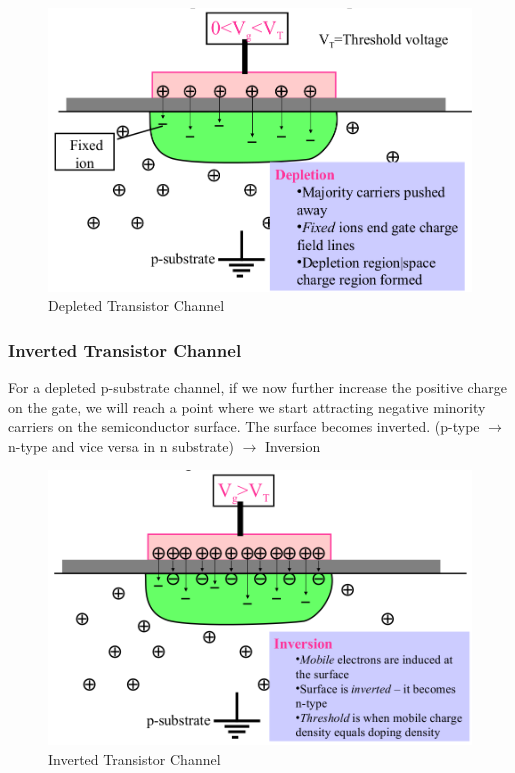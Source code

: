 \documentclass[main]{subfiles}
\begin{document}
\begin{figure}[H]
  \centering
  \includegraphics[scale=1]{figs/channel_depletion.png}
  \caption{Depleted Transistor Channel \cite{lec2}}
  \label{fig:channel_depletion}
\end{figure}

\subsubsection{Inverted Transistor Channel}
For a depleted p-substrate channel, if we now further increase the positive charge on the gate, we will reach a point where we start attracting negative minority carriers on the semiconductor surface. The surface becomes inverted. (p-type $\rightarrow$ n-type and vice versa in n substrate)  $\rightarrow$ Inversion
\begin{figure}[H]
  \centering
  \includegraphics[scale=1]{figs/channel_inversion.png}
  \caption{Inverted Transistor Channel \cite{lec2}}
  \label{fig:channel_inversion}
\end{figure}
\end{document}
